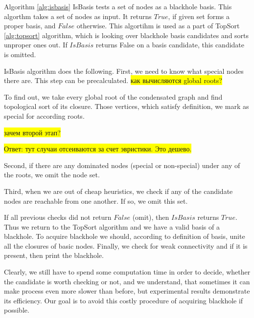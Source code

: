 \documentclass{svproc}
\newcommand{\FIXME}[1]{ %
	\colorbox{yellow}{#1}
}
\newcommand{\FIXME}[1]{ %
}
\begin{document}

Algorithm \ref{alg:isbasis} IsBasis tests a set of nodes as a blackhole basis.
This algorthm takes a set of nodes as input. It returns $True$, if given set forms a proper basis,
and  $False$ otherwise. This algortihm is used as a part of TopSort \ref{alg:topsort} algorithm, which is looking over
blackhole basis candidates and sorts unproper ones out. If $IsBasis$ returns False on a basis candidate, this candidate is omitted.

IsBasis algorithm does the following.
First, we need to know what special nodes there are. This step can be precalculated. 
\FIXME{как вычисляются global roots?}

To find out, we take every global root of the condensated graph and find topological sort of its closure.
Those vertices, which satisfy definition, we mark as special for according roots.

\FIXME{зачем второй этап?}
\FIXME{Ответ: тут случаи отсеиваются за счет эвристики. Это дешево.}

Second, if there are any dominated nodes (special or non-special) under any of the roots, we omit the node set.

Third, when we are out of cheap heuristics, we check if any of the candidate nodes are reachable from one another. 
If so, we omit this set.


If all previous checks did not return $False$ (omit), then $IsBasis$ returns $True$.
Thus we return to the TopSort algorithm and we have a valid basis of a blackhole.
To acquire blackhole we should, according to definition of basis, unite all the closures of basic nodes.
Finally, we check for weak connectivity and if it is present, then print the blackhole.

Clearly, we still have to spend some computation time in order to decide, whether
the candidate is worth checking or not, and we understand, that sometimes it can make process even more slower than before,
but experimental results demonstrate its efficiency.
Our goal is to avoid this costly procedure of acquiring blackhole if possible.
\end{document}
